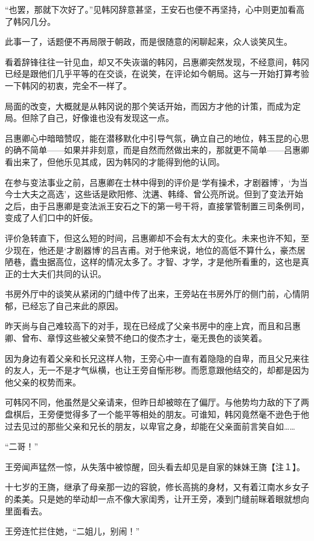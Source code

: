 “也罢，那就下次好了。”见韩冈辞意甚坚，王安石也便不再坚持，心中则更加看高了韩冈几分。

此事一了，话题便不再局限于朝政，而是很随意的闲聊起来，众人谈笑风生。

看着辞锋往往一针见血，却又不失诙谐的韩冈，吕惠卿突然发现，不经意间，韩冈已经是跟他们几乎平等的在交谈，在说笑，在评论如今朝局。这与一开始打算考验一下韩冈的初衷，完全不一样了。

局面的改变，大概就是从韩冈说的那个笑话开始，而因方才他的计策，而成为定局。但除了自己，好像谁也没有发现这一点。

吕惠卿心中暗暗赞叹，能在潜移默化中引导气氛，确立自己的地位，韩玉昆的心思的确不简单——如果并非刻意，而是自然而然做出来的，那就更不简单——吕惠卿看出来了，但他乐见其成，因为韩冈的才能得到他的认同。

在参与变法事业之前，吕惠卿在士林中得到的评价是‘学有操术，才剧器博’，‘为当今士大夫之高选’，这些话是欧阳修、沈遘、韩绛、曾公亮所说。但到了变法开始之后，由于吕惠卿是变法派王安石之下的第一号干将，直接掌管制置三司条例司，变成了人们口中的奸佞。

评价急转直下，但这么短的时间，吕惠卿却不会有太大的变化。未来也许不知，至少现在，他还是‘才剧器博’的吕吉甫。对于他来说，地位的高低不算什么，豪杰居陋巷，蠹虫据高位，这样的情况太多了。才智、才学，才是他所看重的，这也是真正的士大夫们共同的认识。

书房外厅中的谈笑从紧闭的门缝中传了出来，王旁站在书房外厅的侧门前，心情阴郁，已经忘了自己来此的原因。

昨天尚与自己难较高下的对手，现在已经成了父亲书房中的座上宾，而且和吕惠卿、曾布、章惇这些被父亲赞不绝口的俊杰才士，毫无畏色的谈笑着。

因为身边有着父亲和长兄这样人物，王旁心中一直有着隐隐的自卑，而且父兄来往的友人，无一不是才气纵横，也让王旁自惭形秽。而愿意跟他结交的，却都是因为他父亲的权势而来。

可韩冈不同，他虽然是父亲请来，但昨日却被晾在了偏厅。与他势均力敌的下了两盘棋后，王旁便觉得多了一个能平等相处的朋友。可谁知，韩冈竟然毫不逊色于他过去见过的那些父亲和兄长的朋友，以卑官之身，却能在父亲面前言笑自如……

“二哥！”

王旁闻声猛然一惊，从失落中被惊醒，回头看去却见是自家的妹妹王旖【注１】。

十七岁的王旖，继承了母亲那一边的容貌，修长高挑的身材，又有着江南水乡女子的柔美。只是她的举动却一点不像大家闺秀，让开王旁，凑到门缝前眯着眼就想向里面看去。

王旁连忙拦住她，“二姐儿，别闹！”

